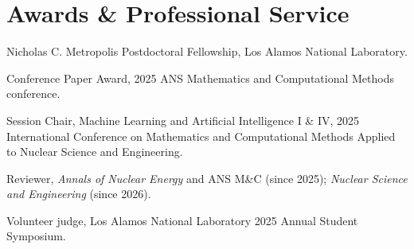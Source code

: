 \documentclass[10.5pt,letterpaper]{article}
\begin{document}
\section{Awards \& Professional Service}
\begin{tight}
  \item Nicholas C. Metropolis Postdoctoral Fellowship, Los Alamos National Laboratory.
  \item Conference Paper Award, 2025 ANS Mathematics and Computational Methods conference.
  \item Session Chair, Machine Learning and Artificial Intelligence I \& IV, 2025 International
    Conference on Mathematics and Computational Methods Applied to Nuclear Science and Engineering.
  \item Reviewer, \textit{Annals of Nuclear Energy} and ANS M\&C (since 2025);
    \textit{Nuclear Science and Engineering} (since 2026).
  \item Volunteer judge, Los Alamos National Laboratory 2025 Annual Student Symposium.
\end{tight}
\end{document}

